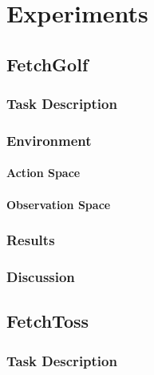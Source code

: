 \chapter{Experiments}




\section{FetchGolf}




\subsection{Task Description}



\subsection{Environment}



\subsubsection{Action Space}



\subsubsection{Observation Space}



\subsection{Results}



\subsection{Discussion}





\section{FetchToss}



\subsection{Task Description}



